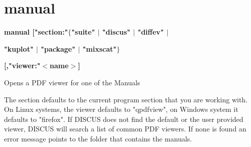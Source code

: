 \section{manual}
{\bf manual ["section:"$ \{$"suite"  $| $ "discus"  $| $ "diffev" $| $ \par }
{\bf                    "kuplot" $| $ "package" $| $ "mixscat"$\} $ \par }
{\bf        [,"viewer:"$ <$name$> $] \par }
\par
\vspace{3pt}
Opens a PDF viewer for one of the Manuals 
\par
The section defaults to the current program section that you are 
working with. 
On Linux systems, the viewer defaults to "qpdfview", on Windows 
system it defaults to "firefox". If DISCUS does not find the 
default or the user provided viewer, DISCUS will search 
a list of common PDF viewers. If none is found an error message 
points to the folder that contains the manuals. 
